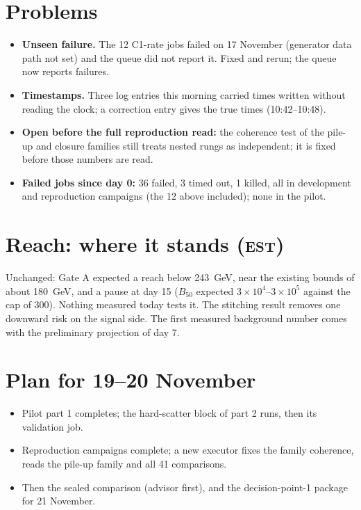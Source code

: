 \documentclass[11pt,a4paper]{article}
\newcommand{\est}{\textsc{est}}
\begin{document}
\section{Problems}
\begin{itemize}
\item \textbf{Unseen failure.} The 12 C1-rate jobs failed on 17 November (generator data path not set) and the
      queue did not report it. Fixed and rerun; the queue now reports failures.
\item \textbf{Timestamps.} Three log entries this morning carried times written without reading the clock; a
      correction entry gives the true times (10:42--10:48).
\item \textbf{Open before the full reproduction read:} the coherence test of the pile-up and closure families
      still treats nested rungs as independent; it is fixed before those numbers are read.
\item \textbf{Failed jobs since day 0:} 36 failed, 3 timed out, 1 killed, all in development and reproduction
      campaigns (the 12 above included); none in the pilot.
\end{itemize}

\section{Reach: where it stands (\est)}
Unchanged: Gate A expected a reach below 243~GeV, near the existing bounds of about 180~GeV, and a pause at
day 15 ($B_{50}$ expected $3\times10^{4}$--$3\times10^{5}$ against the cap of 300). Nothing measured today tests
it. The stitching result removes one downward risk on the signal side. The first measured background number comes
with the preliminary projection of day 7.

\section{Plan for 19--20 November}
\begin{itemize}
\item Pilot part 1 completes; the hard-scatter block of part 2 runs, then its validation job.
\item Reproduction campaigns complete; a new executor fixes the family coherence, reads the pile-up family and all
      41 comparisons.
\item Then the sealed comparison (advisor first), and the decision-point-1 package for 21 November.
\end{itemize}
\end{document}
